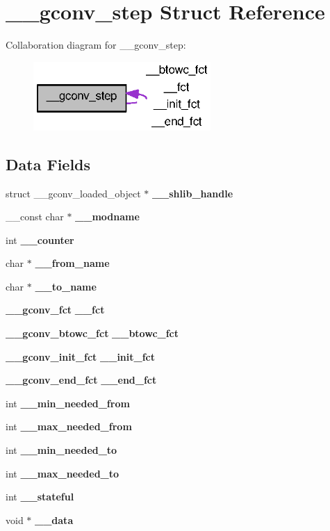 \section{\_\-\_\-gconv\_\-step Struct Reference}
\label{struct____gconv__step}


Collaboration diagram for \_\-\_\-gconv\_\-step:
\nopagebreak
\begin{figure}[H]
\begin{center}
\leavevmode
\includegraphics[width=191pt]{struct____gconv__step__coll__graph}
\end{center}
\end{figure}
\subsection*{Data Fields}
\begin{DoxyCompactItemize}
\item 
struct \_\-\_\-gconv\_\-loaded\_\-object $\ast$ {\bf \_\-\_\-shlib\_\-handle}
\item 
\_\-\_\-const char $\ast$ {\bf \_\-\_\-modname}
\item 
int {\bf \_\-\_\-counter}
\item 
char $\ast$ {\bf \_\-\_\-from\_\-name}
\item 
char $\ast$ {\bf \_\-\_\-to\_\-name}
\item 
{\bf \_\-\_\-gconv\_\-fct} {\bf \_\-\_\-fct}
\item 
{\bf \_\-\_\-gconv\_\-btowc\_\-fct} {\bf \_\-\_\-btowc\_\-fct}
\item 
{\bf \_\-\_\-gconv\_\-init\_\-fct} {\bf \_\-\_\-init\_\-fct}
\item 
{\bf \_\-\_\-gconv\_\-end\_\-fct} {\bf \_\-\_\-end\_\-fct}
\item 
int {\bf \_\-\_\-min\_\-needed\_\-from}
\item 
int {\bf \_\-\_\-max\_\-needed\_\-from}
\item 
int {\bf \_\-\_\-min\_\-needed\_\-to}
\item 
int {\bf \_\-\_\-max\_\-needed\_\-to}
\item 
int {\bf \_\-\_\-stateful}
\item 
void $\ast$ {\bf \_\-\_\-data}
\end{DoxyCompactItemize}



